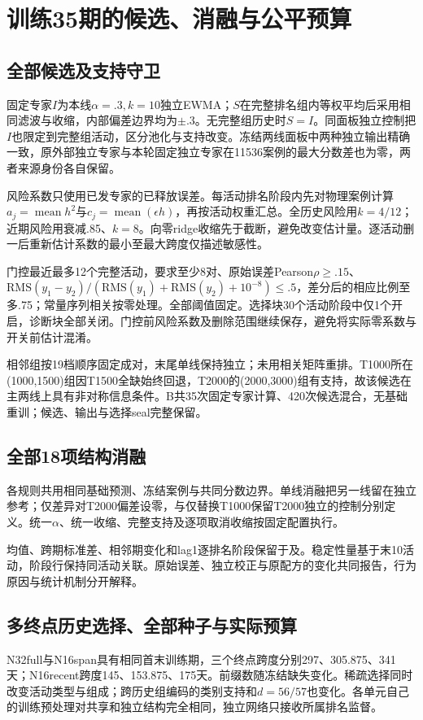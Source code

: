 \section{训练35期的候选、消融与公平预算}\label{sec:round2supp}
\subsection{全部候选及支持守卫}
固定专家\(I\)为本线\(\alpha=.3,k=10\)独立EWMA；\(S\)在完整排名组内等权平均后采用相同滤波与收缩，内部偏差边界均为\(\pm.3\)。无完整组历史时\(S=I\)。同面板独立控制把\(I\)也限定到完整组活动，区分池化与支持改变。冻结两线面板中两种独立输出精确一致，原外部独立专家与本轮固定独立专家在11536案例的最大分数差也为零，两者来源身份各自保留。

风险系数只使用已发专家的已释放误差。每活动排名阶段内先对物理案例计算\(a_j=\operatorname{mean}h^2\)与\(c_j=\operatorname{mean}(\epsilon h)\)，再按活动权重汇总。全历史风险用\(k=4/12\)；近期风险用衰减.85、\(k=8\)。向零ridge收缩先于截断，避免改变估计量。逐活动删一后重新估计系数的最小至最大跨度仅描述敏感性。

门控最近最多12个完整活动，要求至少8对、原始误差Pearson\(\rho\ge.15\)、\(\mathrm{RMS}(y_1-y_2)/(\mathrm{RMS}(y_1)+\mathrm{RMS}(y_2)+10^{-8})\le.5\)，差分后的相应比例至多.75；常量序列相关按零处理。全部阈值固定。选择块30个活动阶段中仅1个开启，诊断块全部关闭。门控前风险系数及删除范围继续保存，避免将实际零系数与开关前估计混淆。



相邻组按19档顺序固定成对，末尾单线保持独立；未用相关矩阵重排。T1000所在(1000,1500)组因T1500全缺始终回退，T2000的(2000,3000)组有支持，故该候选在主两线上具有非对称信息条件。B共35次固定专家计算、420次候选混合，无基础重训；候选、输出与选择seal完整保留。

\subsection{全部18项结构消融}
各规则共用相同基础预测、冻结案例与共同分数边界。单线消融把另一线留在独立参考；仅差异对T2000偏差设零，与仅替换T1000保留T2000独立的控制分别定义。统一\(\alpha\)、统一收缩、完整支持及逐项取消收缩按固定配置执行。

均值、跨期标准差、相邻期变化和lag1逐排名阶段保留于及。稳定性量基于末10活动，阶段行保持同活动关联。原始误差、独立校正与原配方的变化共同报告，行为原因与统计机制分开解释。

\subsection{多终点历史选择、全部种子与实际预算}
N32full与N16span具有相同首末训练期，三个终点跨度分别297、305.875、341天；N16recent跨度145、153.875、175天。前缀数随冻结缺失变化。稀疏选择同时改变活动类型与组成；跨历史组编码的类别支持和\(d=56/57\)也变化。各单元自己的训练预处理对共享和独立结构完全相同，独立网络只接收所属排名监督。

